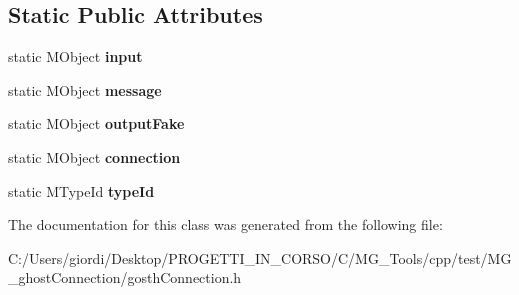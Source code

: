 \subsection*{Static Public Attributes}
\begin{DoxyCompactItemize}
\item 
\hypertarget{classgosth_connection_a83f0aabb7d86030797081100fcc66602}{static M\-Object {\bfseries input}}\label{classgosth_connection_a83f0aabb7d86030797081100fcc66602}

\item 
\hypertarget{classgosth_connection_a3f830b03d5864884c04b3f4b0f30dcd5}{static M\-Object {\bfseries message}}\label{classgosth_connection_a3f830b03d5864884c04b3f4b0f30dcd5}

\item 
\hypertarget{classgosth_connection_a711bfde83e3494fdd3fa8d5d1f5acb3b}{static M\-Object {\bfseries output\-Fake}}\label{classgosth_connection_a711bfde83e3494fdd3fa8d5d1f5acb3b}

\item 
\hypertarget{classgosth_connection_affcdef0227bcf94ed4672eae680b435e}{static M\-Object {\bfseries connection}}\label{classgosth_connection_affcdef0227bcf94ed4672eae680b435e}

\item 
\hypertarget{classgosth_connection_a73121e6fb86d914eabb49cdafeb2b602}{static M\-Type\-Id {\bfseries type\-Id}}\label{classgosth_connection_a73121e6fb86d914eabb49cdafeb2b602}

\end{DoxyCompactItemize}


The documentation for this class was generated from the following file\-:\begin{DoxyCompactItemize}
\item 
C\-:/\-Users/giordi/\-Desktop/\-P\-R\-O\-G\-E\-T\-T\-I\-\_\-\-I\-N\-\_\-\-C\-O\-R\-S\-O/\-C/\-M\-G\-\_\-\-Tools/cpp/test/\-M\-G\-\_\-ghost\-Connection/gosth\-Connection.\-h\end{DoxyCompactItemize}
